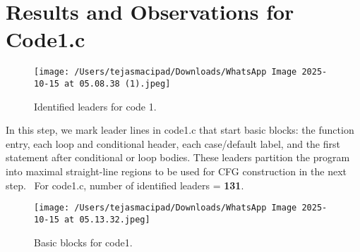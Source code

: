 \documentclass[12pt, a4paper]{report}
\begin{document}





\newpage
\section{Results and Observations for Code1.c}

\begin{figure}[H]
\centering
\texttt{[image: /Users/tejasmacipad/Downloads/WhatsApp Image 2025-10-15 at 05.08.38 (1).jpeg]}
\caption{Identified leaders for code 1.}
\label{fig:diff-example-61}
\end{figure}

\noindent In this step, we mark leader lines in code1.c that start basic blocks: the function entry, each loop and conditional header, each case/default label, and the first statement after conditional or loop bodies. These leaders partition the program into maximal straight-line regions to be used for CFG construction in the next step.\
\newline
\noindent For code1.c, number of identified leaders = \textbf{131}.


\begin{figure}[H]
\centering
\texttt{[image: /Users/tejasmacipad/Downloads/WhatsApp Image 2025-10-15 at 05.13.32.jpeg]}
\caption{Basic blocks for code1.}
\label{fig:diff-example-62}
\end{figure}
\end{document}
